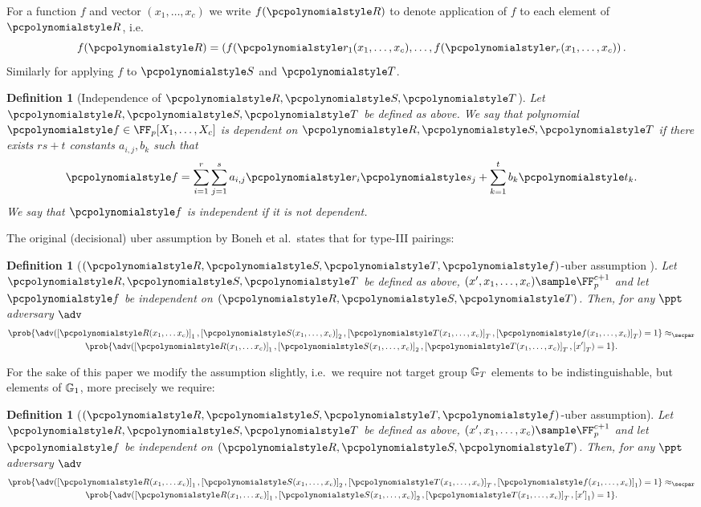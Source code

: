 \let\accentvec\vec \documentclass[runningheads]{llncs}
\newtheorem{definition}[theorem]{Definition}
\begin{document}
For a function $f$ and vector $(x_1, \ldots, x_c)$ we write $f(\pR)$ to
denote application of $f$ to each element of $\pR$, i.e.
\[
	f(\pR) = \left( f(\p{r}_1 (x_1, \ldots, x_c), \ldots, f(\p{r}_r
	(x_1, \ldots, x_c) \right).
\]
Similarly for applying $f$ to $\pS$ and $\pT$.

\begin{definition}[Independence of $\pR, \pS, \pT$]
	\label{def:independence}
	Let $\pR, \pS, \pT$ be defined as above. We say that polynomial
	$\p{f} \in \FF_p[X_1, \ldots, X_c]$ is \emph{dependent} on $\pR, \pS,
	\pT$ if there exists $rs + t$ constants $a_{i, j}, b_k$ such that 
	\[
		\p{f} = \sum_{i = 1}^{r} \sum_{j = 1}^{s} a_{i, j} \p{r}_i \p{s}_j +
		\sum_{k = 1}^{t} b_k \p{t}_k.
	\]
	We say that $\p{f}$ is \emph{independent} if it is not dependent.
\end{definition}

The original (decisional) uber assumption by Boneh et al.~states that for
type-III pairings:

\begin{definition}[$(\pR, \pS, \pT, \p{f})$-uber assumption
	\cite{EC:BonBoyGoh05}]
	\label{def:uber_assumption_orig}
	Let $\pR, \pS, \pT$ be defined as above, $(x', x_1, \ldots, x_c) \sample \FF_p^{c + 1}$ and let
	$\p{f}$ be independent on $(\pR, \pS, \pT)$.
	Then, for any $\ppt$ adversary $\adv$
	\begin{multline*}
		\prob{\adv(\gone{\pR(x_1, \ldots x_c)}, \gtwo{\pS(x_1, \ldots, x_c)},
		\gtar{\pT(x_1, \ldots, x_c)}, \gtar{\p{f}(x_1, \ldots, x_c)}) = 1} \approx_\secpar \\ 
		\prob{\adv(\gone{\pR(x_1, \ldots x_c)}, \gtwo{\pS(x_1, \ldots, x_c)},
		\gtar{\pT(x_1, \ldots, x_c)}, \gtar{x'}) = 1}.  
	\end{multline*}
\end{definition}

For the sake of this paper we modify the assumption slightly, i.e.~we require
not target group $\mathbb{G}_T$ elements to be indistinguishable, but elements of
$\mathbb{G}_1$, more precisely we require: 

\begin{definition}[$(\pR, \pS, \pT, \p{f})$-uber assumption]
	\label{def:uber_assumption}
	Let $\pR, \pS, \pT$ be defined as above, $(x', x_1, \ldots, x_c) \sample \FF_p^{c + 1}$ and let
	$\p{f}$ be independent on $(\pR, \pS, \pT)$.
	Then, for any $\ppt$ adversary $\adv$
	\begin{multline*}
		\prob{\adv(\gone{\pR(x_1, \ldots x_c)}, \gtwo{\pS(x_1, \ldots, x_c)},
		\gtar{\pT(x_1, \ldots, x_c)}, \gone{\p{f}(x_1, \ldots, x_c)}) = 1} \approx_\secpar \\ 
		\prob{\adv(\gone{\pR(x_1, \ldots x_c)}, \gtwo{\pS(x_1, \ldots, x_c)},
		\gtar{\pT(x_1, \ldots, x_c)}, \gone{x'}) = 1}.  
	\end{multline*}
\end{definition}
\end{document}

